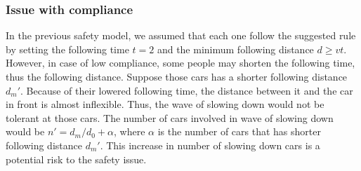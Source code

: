 \subsubsection{Issue with compliance}

In the previous safety model, we assumed that each one follow the suggested rule by setting the following time $t = 2$ and  the minimum following distance $d \ge vt$. However, in case of low compliance, some people may shorten the following time, thus the following distance. Suppose those cars has a shorter following distance $d_m'$. Because of their lowered following time, the distance between it and the car in front is almost inflexible. Thus, the wave of slowing down would not be tolerant at those cars. The number of cars involved in wave of slowing down would be $n' = d_m/d_0+\alpha$, where $\alpha$ is the number of cars that has shorter following distance $d_m'$. This increase in number of slowing down cars is a potential risk to the safety issue. 